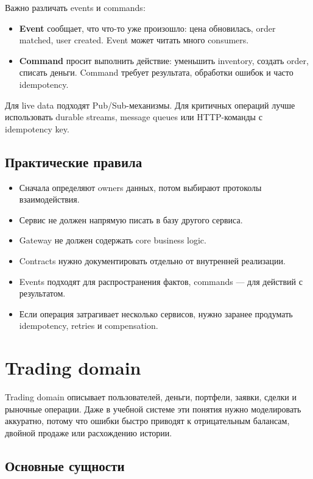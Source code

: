\documentclass[12pt,a4paper]{article}
\begin{document}
Важно различать events и commands:
\begin{itemize}
    \item \textbf{Event} сообщает, что что-то уже произошло: цена обновилась,
          order matched, user created. Event может читать много consumers.
    \item \textbf{Command} просит выполнить действие: уменьшить inventory, создать
          order, списать деньги. Command требует результата, обработки ошибок и
          часто idempotency.
\end{itemize}

Для live data подходят Pub/Sub-механизмы. Для критичных операций лучше использовать
durable streams, message queues или HTTP-команды с idempotency key.

\subsection{Практические правила}

\begin{itemize}
    \item Сначала определяют owners данных, потом выбирают протоколы взаимодействия.
    \item Сервис не должен напрямую писать в базу другого сервиса.
    \item Gateway не должен содержать core business logic.
    \item Contracts нужно документировать отдельно от внутренней реализации.
    \item Events подходят для распространения фактов, commands --- для действий с результатом.
    \item Если операция затрагивает несколько сервисов, нужно заранее продумать
          idempotency, retries и compensation.
\end{itemize}

\newpage
\section{Trading domain}

Trading domain описывает пользователей, деньги, портфели, заявки, сделки и
рыночные операции. Даже в учебной системе эти понятия нужно моделировать
аккуратно, потому что ошибки быстро приводят к отрицательным балансам, двойной
продаже или расхождению истории.

\subsection{Основные сущности}
\end{document}
